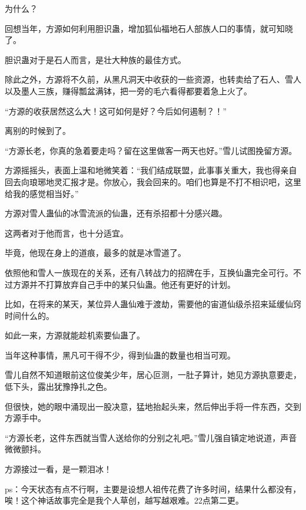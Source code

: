 \begin{this_body}
为什么？

回想当年，方源如何利用胆识蛊，增加狐仙福地石人部族人口的事情，就可知晓了。

胆识蛊对于是石人而言，是壮大种族的最佳方式。

除此之外，方源将不久前，从黑凡洞天中收获的一些资源，也转卖给了石人、雪人以及墨人三族，赚得瓢盆满钵，把一旁的毛六看得都要着急上火了。

“方源的收获居然这么大！这可如何是好？今后如何遏制？！”

离别的时候到了。

“方源长老，你真的急着要走吗？留在这里做客一两天也好。”雪儿试图挽留方源。

方源摇摇头，表面上温和地微笑着：“我们结成联盟，此事事关重大，我也得亲自回去向琅琊地灵汇报才是。你放心，我会回来的。咱们也算是不打不相识吧，这里给我的感觉相当好。”

方源对雪人蛊仙的冰雪流派的仙蛊，还有杀招都十分感兴趣。

这两者对于他而言，也十分适宜。

毕竟，他现在身上的道痕，最多的就是冰雪道了。

依照他和雪人一族现在的关系，还有八转战力的招牌在手，互换仙蛊完全可行。不过方源并不打算放弃自己手中的某只仙蛊。他还有更好的计划。

比如，在将来的某天，某位异人蛊仙难于渡劫，需要他的宙道仙级杀招来延缓仙窍时间什么的。

如此一来，方源就能趁机索要仙蛊了。

当年这种事情，黑凡可干得不少，得到仙蛊的数量也相当可观。

雪儿自然不知道眼前这位俊美少年，居心叵测，一肚子算计，她见方源执意要走，低下头，露出犹豫挣扎之色。

但很快，她的眼中涌现出一股决意，猛地抬起头来，然后伸出手将一件东西，交到方源手中。

“方源长老，这件东西就当雪人送给你的分别之礼吧。”雪儿强自镇定地说道，声音微微颤抖。

方源接过一看，是一颗泪冰！

ps：今天状态有点不行啊，主要是设想人祖传花费了许多时间，结果什么都没有，唉！这个神话故事完全是我个人草创，越写越艰难。22点第二更。

\end{this_body}

